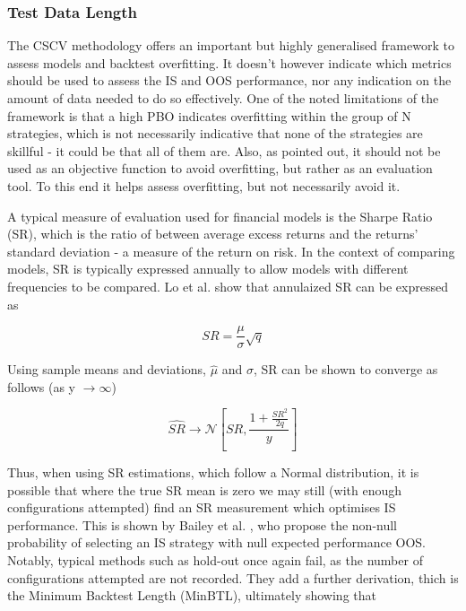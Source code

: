 \documentclass[a4paper,latin]{paper}
\begin{document}
\subsubsection{Test Data Length}

The CSCV methodology offers an important but highly generalised framework to assess models and backtest 
overfitting. It doesn’t however indicate which metrics should be used to assess the IS and OOS performance, nor 
any indication on the amount of data needed to do so effectively. One of the noted limitations of the framework is 
that a high PBO indicates overfitting within the group of N strategies, which is not necessarily indicative that none 
of the strategies are skillful - it could be that all of them are. Also, as pointed out, it should not be used as an 
objective function to avoid overfitting, but rather as an evaluation tool. To this end it helps assess overfitting, but 
not necessarily avoid it. 
\hfill \break 

A typical measure of evaluation used for financial models is the Sharpe Ratio (SR), which is the ratio of between 
average excess returns and the returns’ standard deviation - a measure of the return on risk. In the context of 
comparing models, SR is typically expressed annually to allow models with different frequencies to be compared. 
Lo et al. \cite{Lo} show that annulaized SR can be expressed as

\begin{equation}\label{SRAnnual}
SR=\frac{\mu}{\sigma}\sqrt{q}
\end{equation}

Using sample means and deviations, $\hat{\mu}$ and $\hat{\sigma}$, SR can be shown to converge as follows 
(as y $\rightarrow\infty$)

\begin{equation}\label{SRConvergence}
  \hat{SR}  \rightarrow \mathcal {N} [SR,\frac{1 + \frac{SR^2}{2q}}{y}]
\end{equation}

Thus, when using SR estimations, which follow a Normal distribution, it is possible that where the true SR mean is 
zero we may still (with enough configurations attempted) find an SR measurement which optimises IS performance. 
This is shown by Bailey et al. \cite{BaileyBTL}, who propose the non-null probability of selecting an IS strategy with null expected 
performance OOS. Notably, typical methods such as hold-out once again fail, as the number of configurations 
attempted are not recorded. They add a further derivation, thich is the Minimum Backtest Length (MinBTL), ultimately 
showing that
\end{document}

